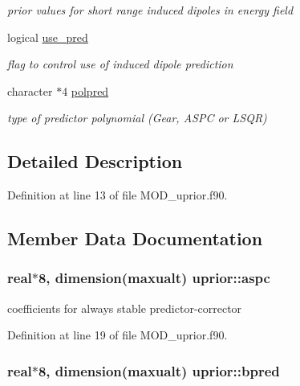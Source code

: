 \begin{DoxyCompactItemize}
\begin{DoxyCompactList}\small\item\em prior values for short range induced dipoles in energy field \end{DoxyCompactList}\item 
logical \hyperlink{classuprior_a368331c2d6701085f91aefbec9f727d8}{use\-\_\-pred}
\begin{DoxyCompactList}\small\item\em flag to control use of induced dipole prediction \end{DoxyCompactList}\item 
character $\ast$4 \hyperlink{classuprior_af700e3d1134904cd27e3a631b0af018f}{polpred}
\begin{DoxyCompactList}\small\item\em type of predictor polynomial (Gear, A\-S\-P\-C or L\-S\-Q\-R) \end{DoxyCompactList}\end{DoxyCompactItemize}


\subsection{Detailed Description}


Definition at line 13 of file M\-O\-D\-\_\-uprior.\-f90.



\subsection{Member Data Documentation}
\hypertarget{classuprior_a41ee89e59357405b080d883f3c4383b6}{
\subsubsection[{aspc}]{\setlength{\rightskip}{0pt plus 5cm}real$\ast$8, dimension({\bf maxualt}) uprior\-::aspc}}\label{classuprior_a41ee89e59357405b080d883f3c4383b6}


coefficients for always stable predictor-\/corrector 



Definition at line 19 of file M\-O\-D\-\_\-uprior.\-f90.

\hypertarget{classuprior_a701f83e155c86aa0b227727803852c91}{
\subsubsection[{bpred}]{\setlength{\rightskip}{0pt plus 5cm}real$\ast$8, dimension({\bf maxualt}) uprior\-::bpred}}\label{classuprior_a701f83e155c86aa0b227727803852c91}


